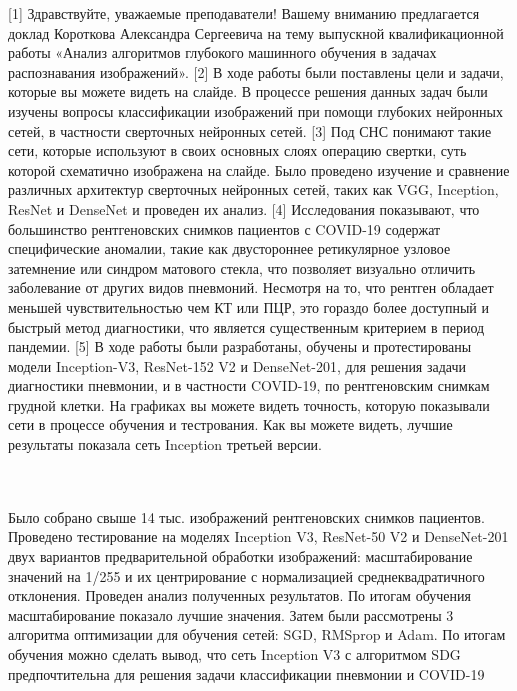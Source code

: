 [1]
Здравствуйте, уважаемые преподаватели!
Вашему вниманию предлагается доклад Короткова Александра Сергеевича на тему выпускной квалификационной работы «Анализ алгоритмов глубокого машинного обучения  в задачах распознавания изображений».
[2]
В ходе работы были поставлены цели и задачи, которые вы можете видеть на слайде.
В процессе решения данных задач были изучены вопросы классификации изображений при помощи глубоких нейронных сетей, в частности сверточных нейронных сетей. 
[3]
Под СНС понимают такие сети, которые используют в своих основных слоях операцию свертки, суть которой схематично изображена на слайде. Было проведено изучение и сравнение различных архитектур сверточных нейронных сетей, таких как VGG, Inception, ResNet и DenseNet и проведен их анализ.   
[4]
Исследования показывают, что большинство рентгеновских снимков пациентов с COVID-19 содержат специфические аномалии, такие как двустороннее ретикулярное узловое затемнение или синдром матового стекла, что позволяет визуально отличить заболевание от других видов пневмоний. Несмотря на то, что рентген обладает меньшей чувствительностью чем КТ или ПЦР, это гораздо более доступный и быстрый метод диагностики, что является существенным критерием в период пандемии.
[5]
В ходе работы были разработаны, обучены и протестированы модели Inception-V3, ResNet-152 V2 и DenseNet-201, для решения задачи диагностики пневмонии, и в частности COVID-19, по рентгеновским снимкам грудной клетки. На графиках вы можете видеть точность, которую показывали сети в процессе обучения и тестрования. Как вы можете видеть, лучшие результаты показала сеть Inception третьей версии.



\\\\
Было собрано свыше 14 тыс. изображений рентгеновских снимков пациентов. Проведено тестирование на моделях Inception V3, ResNet­-50 V2 и DenseNet-201 двух вариантов предварительной обработки изображений: масштабирование значений на 1/255 и их центрирование с нормализацией среднеквадратичного отклонения. Проведен анализ полученных результатов. По итогам обучения масштабирование показало лучшие значения. 
Затем были рассмотрены 3 алгоритма оптимизации для обучения сетей: SGD, RMSprop и Adam. По итогам обучения можно сделать вывод, что сеть Inception V3 с алгоритмом SDG предпочтительна для решения задачи классификации пневмонии и COVID-19
